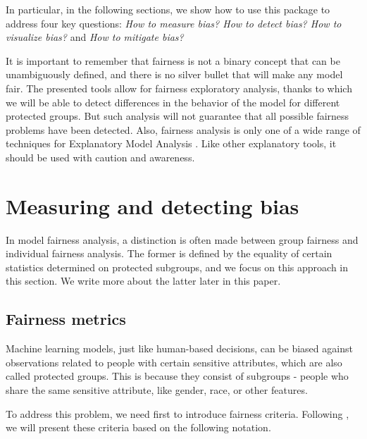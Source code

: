 In particular, in the following sections, we show how to use this
package to address four key questions: \emph{How to measure bias? How to
detect bias? How to visualize bias?} and \emph{How to mitigate bias?}

It is important to remember that fairness is not a binary concept that
can be unambiguously defined, and there is no silver bullet that will
make any model fair. The presented tools allow for fairness exploratory
analysis, thanks to which we will be able to detect differences in the
behavior of the model for different protected groups. But such analysis
will not guarantee that all possible fairness problems have been
detected. Also, fairness analysis is only one of a wide range of
techniques for Explanatory Model Analysis \citep{ema2021}. Like other
explanatory tools, it should be used with caution and awareness.

\hypertarget{measuring-and-detecting-bias}{%
\section{Measuring and detecting
bias}\label{measuring-and-detecting-bias}}

In model fairness analysis, a distinction is often made between group
fairness and individual fairness analysis. The former is defined by the
equality of certain statistics determined on protected subgroups, and we
focus on this approach in this section. We write more about the latter
later in this paper.

\hypertarget{detect}{%
\subsection{Fairness metrics}\label{detect}}

Machine learning models, just like human-based decisions, can be biased
against observations related to people with certain sensitive
attributes, which are also called protected groups. This is because they
consist of subgroups - people who share the same sensitive attribute,
like gender, race, or other features.

To address this problem, we need first to introduce fairness criteria.
Following \citet{barocas-hardt-narayanan}, we will present these
criteria based on the following notation.

